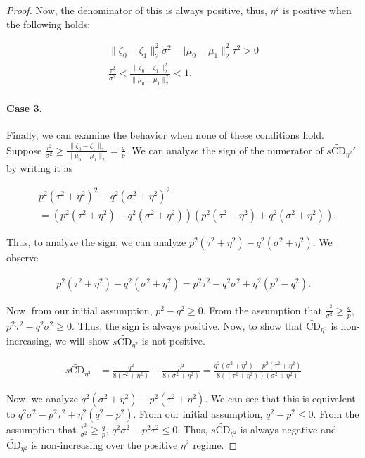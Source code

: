 \documentclass[11pt,letterpaper]{article}
\begin{document}
\begin{proof}
Now, the denominator of this is always positive, thus, $\eta^2$ is positive when the following holds:

\begin{align}
    \|\zeta_0 - \zeta_1\|_2^2\sigma^2-|\mu_0 - \mu_1\|_2^2\tau^2 > 0
    \\ \frac{\tau^2}{\sigma^2} < \frac{\|\zeta_0 - \zeta_1\|^2_2}{\|\mu_0 - \mu_1\|^2_2} < 1.
\end{align}

\paragraph{Case 3.} Finally, we can examine the behavior when none of these conditions hold. Suppose $\frac{\tau^2}{\sigma^2} \geq \frac{\|\zeta_0 - \zeta_1\|_2}{\|\mu_0 - \mu_1\|_2} = \frac{q}{p}$. We can analyze the sign of the numerator of $s\widetilde{\text{CD}}_{\eta^2}'$ by writing it as

\begin{align}
    &p^2(\tau^2 + \eta^2)^2 - q^2(\sigma^2 + \eta^2)^2 \\
            &= (p^2(\tau^2 + \eta^2) - q^2(\sigma^2 + \eta^2))(p^2(\tau^2 + \eta^2) + q^2(\sigma^2 + \eta^2)).
\end{align}

Thus, to analyze the sign, we can analyze $p^2(\tau^2 + \eta^2) - q^2(\sigma^2 + \eta^2)$. We observe

\begin{align}
    p^2(\tau^2 + \eta^2) - q^2(\sigma^2 + \eta^2) = p^2\tau^2 - q^2\sigma^2 + \eta^2(p^2 - q^2).
\end{align}

Now, from our initial assumption, $p^2 - q^2 \geq 0$. From the assumption that $\frac{\tau^2}{\sigma^2} \geq  \frac{q}{p}$, $p^2\tau^2 - q^2\sigma^2 \geq 0$. Thus, the sign is always positive. Now, to show that $\widetilde{\text{CD}}_{\eta^2}$ is non-increasing, we will show $s\widetilde{\text{CD}}_{\eta^2}$ is not positive. 

\begin{align}
    s\widetilde{\text{CD}}_{\eta^2} &= \frac{q^2}{8(\tau^2 + \eta^2)} - \frac{p^2}{8(\sigma^2 + \eta^2)}  = \frac{q^2(\sigma^2 + \eta^2) - p^2(\tau^2 + \eta^2)}{8((\tau^2 + \eta^2))(\sigma^2 + \eta^2)}
\end{align}

Now, we analyze $q^2(\sigma^2 + \eta^2) - p^2(\tau^2 + \eta^2)$. We can see that this is equivalent to $q^2\sigma^2 - p^2\tau^2 + \eta^2(q^2 - p^2)$. From our initial assumption, $q^2 - p^2 \leq 0$. From the assumption that $\frac{\tau^2}{\sigma^2} \geq \frac{q}{p}$, $q^2\sigma^2 - p^2\tau^2 \leq 0$. Thus, $s\widetilde{\text{CD}}_{\eta^2}$ is always negative and $\widetilde{\text{CD}}_{\eta^2}$ is non-increasing over the positive $\eta^2$ regime.
\end{proof}
\end{document}
